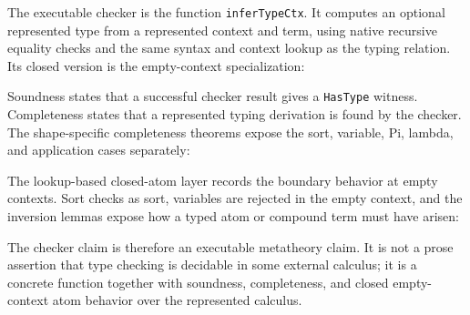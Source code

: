 The executable checker is the function \texttt{inferTypeCtx}.  It computes an
optional represented type from a represented context and term, using native
recursive equality checks and the same syntax and context lookup as the
typing relation.  Its closed version is the empty-context specialization:


Soundness states that a successful checker result gives a \texttt{HasType}
witness.  Completeness states that a represented typing derivation is found by
the checker.  The shape-specific completeness theorems expose the sort,
variable, Pi, lambda, and application cases separately:


The lookup-based closed-atom layer records the boundary behavior at empty
contexts.  Sort checks as sort, variables are rejected in the empty context,
and the inversion lemmas expose how a typed atom or compound term must have
arisen:


The checker claim is therefore an executable metatheory claim.  It is not a
prose assertion that type checking is decidable in some external calculus; it
is a concrete function together with soundness, completeness, and closed
empty-context atom behavior over the represented calculus.

